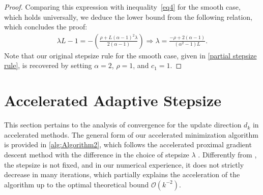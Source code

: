 \documentclass[11pt, a4paper, oneside, reqno]{amsart}
\begin{document}
{\begin{proof}
Comparing this expression with inequality~\eqref{eq4} for the smooth case, which holds universally, we deduce the lower bound from the following relation, which concludes the proof:
\begin{align*}
    \lambda L - 1 = - \left(\frac{\rho+L(\alpha-1)^2 \lambda}{2(\alpha - 1)}\right) \Rightarrow \lambda = \frac{-\rho + 2(\alpha - 1)}{(\alpha^2 - 1)L}.
\end{align*}
Note that our original stepsize rule for the smooth case, given in \eqref{partial stepsize rule}, is recovered by setting $\alpha = 2$, $\rho = 1$, and $c_1 = 1$.
\end{proof}

}
\section{Accelerated Adaptive Stepsize}\label{Accelerated adaptive stepsize}
This section pertains to the analysis of convergence for the update direction $d_k$ in accelerated methods. The general form of our accelerated minimization algorithm is provided in \ref{alg:Algorithm2}, which follows the accelerated proximal gradient descent method with the difference in the choice of stepsize $\lambda$ \cite{Nesterov1983, Nesterov2018, bubeck2015convex}. Differently from \cite{Nesterov1983,Beck2009}, the stepsize is not fixed, and in our numerical experience, it does not strictly decrease in many iterations, which partially explains the acceleration of the algorithm up to the optimal theoretical bound $\mathcal{O}(k^{-2})$.

\end{document}
